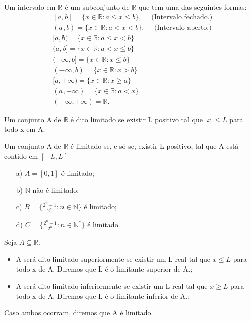 \documentclass[analysis_notes.tex]{subfiles}
\begin{document}
\begin{def*}
	Um intervalo em $\mathbb{R}$ \'e um subconjunto de $\mathbb{R}$ que tem uma das seguintes formas:
	\begin{align*}
		 & [a, b] = \{x\in \mathbb{R}: a\leq{x}\leq{b}\},\quad \text{ (Intervalo fechado.) } \\
		 & (a, b) = \{x\in \mathbb{R}: a < x < b\},\quad \text{ (Intervalo aberto.) }        \\
		 & [a, b) = \{x\in \mathbb{R}: a \leq{x} < b\}                                       \\
		 & (a, b] = \{x\in \mathbb{R}: a < x \leq{b}\}                                       \\
		 & (-\infty, b] = \{x\in \mathbb{R}: x\leq{b}\}                                      \\
		 & (-\infty, b) = \{x\in \mathbb{R}: x > b\}                                         \\
		 & [a, +\infty) = \{x\in \mathbb{R}: x\geq{a}\}                                      \\
		 & (a, +\infty) = \{x\in \mathbb{R}: a < x\}                                         \\
		 & (-\infty, +\infty) = \mathbb{R}.
	\end{align*}
\end{def*}
\begin{def*}
	Um conjunto A de $\mathbb{R}$ \'e dito limitado se existir L positivo tal que $|x| \leq L$ para todo x em A.
\end{def*}
\begin{prop*}
	Um conjunto A de $\mathbb{R}$ \'e limitado se, e s\'o se, existir L positivo, tal que A est\'a contido em $[-L, L]$
\end{prop*}
\begin{example}
	\begin{itemize}
		\item[a)] $A = [0, 1]$ \'e limitado;
		\item[b)] $\mathbb{N}$ n\~ao \'e limitado;
		\item[c)] $B = \biggl\{\displaystyle \frac{2^n-1}{2^n}: n\in \mathbb{N}\biggr\}$ \'e limitado;
		\item[d)] $C = \biggl\{\displaystyle \frac{2^n-1}{2^n}: n\in \mathbb{N}^{*}\biggr\}$ \'e limitado.
	\end{itemize}
\end{example}
\begin{def*}
	Seja $A\subseteq{\mathbb{R}}$.
	\begin{itemize}
		\item A ser\'a dito limitado superiormente se existir um L real tal que $x\leq L$ para todo x de A. Diremos que L \'e o limitante superior de A.;
		\item A ser\'a dito limitado inferiormente se existir um L real tal que $x\geq L$ para todo x de A. Diremos que L \'e o limitante inferior de A.;
	\end{itemize}
	Caso ambos ocorram, diremos que A \'e limitado.
\end{def*}
\end{document}
